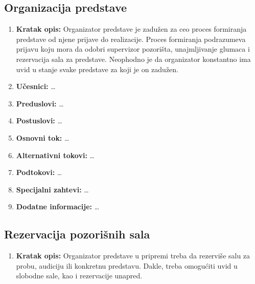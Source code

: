 \documentclass[a4paper]{article}
\begin{document}
\subsection{Organizacija predstave}
\begin{enumerate}
  \item \textbf{Kratak opis:} Organizator predstave je zadužen za ceo proces formiranja predstave od njene prijave do realizacije. 
        Proces formiranja podrazumeva prijavu koju mora da odobri supervizor pozorišta, unajmljivanje 
        glumaca i rezervacija sala za predstave. Neophodno je da organizator konstantno ima uvid u stanje
        svake predstave za koji je on zadužen.
  \item \textbf{Učesnici:} \dots
  \item \textbf{Preduslovi:} \dots
  \item \textbf{Postuslovi:} \dots
  \item \textbf{Osnovni tok:} \dots
  \item \textbf{Alternativni tokovi:} \dots
  \item \textbf{Podtokovi:} \dots
  \item \textbf{Specijalni zahtevi:} \dots
  \item \textbf{Dodatne informacije:} \dots

\end{enumerate}

\subsection{Rezervacija pozorišnih sala}
\begin{enumerate}
  \item \textbf{Kratak opis:} Organizator predstave u pripremi treba da rezerviše salu za probu, 
        audiciju ili konkretnu predstavu. Dakle, treba omogućiti uvid u slobodne sale, 
        kao i rezervacije unapred.
\end{enumerate}
\end{document}
